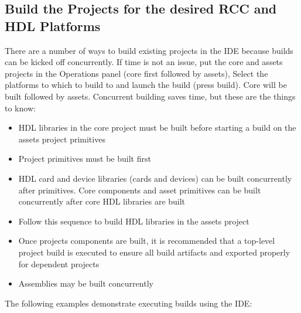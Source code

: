 \subsection{Build the Projects for the desired RCC and HDL Platforms}
There are a number of ways to build existing projects in the IDE because builds can be kicked off concurrently. If time is not an issue, put the core and assets projects in the Operations panel (core first followed by assets), Select the platforms to which to build to and launch the build (press build). Core will be built followed by assets.
Concurrent building saves time, but these are the things to know:
\begin{itemize}
\item	HDL libraries in the core project must be built before starting a build on the assets project primitives
\item	Project primitives must be built first
\item	HDL card and device libraries (cards and devices) can be built concurrently after primitives. Core components and asset primitives can be built concurrently after core HDL libraries are built
\item	Follow this sequence to build HDL libraries in the assets project
\item	Once projects components are built, it is recommended that a top-level project build is executed to ensure all build artifacts and exported properly for dependent projects
\item	Assemblies may be built concurrently
\end{itemize}
The following examples demonstrate executing builds using the IDE:
